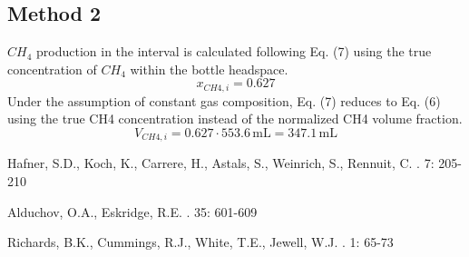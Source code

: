 \documentclass[]{article}
\newcommand{\unit}[1]{\ensuremath{\, \mathrm{#1}}}
\begin{document}
\subsection{Method 2}
$CH_{4}$  production in the interval is calculated following Eq. (7) using the true concentration of $CH_{4}$ within the bottle headspace.
\begin{equation*}
    x_{CH{4},i} = 0.627
\end{equation*}
Under the assumption of constant gas composition, Eq. (7) reduces to Eq. (6) using the true CH4 concentration instead of the normalized CH4 volume fraction.
\begin{equation*}
    V_{CH{4},i} = 0.627 \cdot 553.6\unit{mL} = 347.1\unit{mL}
\end{equation*}

\begin{thebibliography}{1}

Hafner, S.D., Koch, K., Carrere, H., Astals, S., Weinrich, S., Rennuit, C.
    . 
     7: 205-210

Alduchov, O.A., Eskridge, R.E.    
    . 
     35: 601-609

Richards, B.K., Cummings, R.J., White, T.E., Jewell, W.J.    
    . 
     1: 65-73

\end{thebibliography}


%
\end{document}
